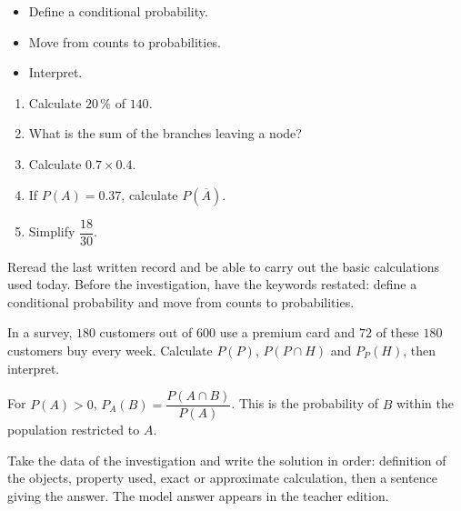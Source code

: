 \begin{objectifs}\begin{itemize}\item Define a conditional probability.\item Move from counts to probabilities.\item Interpret.\end{itemize}\end{objectifs}
\begin{automatismes}\begin{enumerate}\item Calculate $20\,\%$ of $140$. \item What is the sum of the branches leaving a node? \item Calculate $0.7\times0.4$. \item If $P(A)=0.37$, calculate $P(\overline A)$. \item Simplify $\dfrac{18}{30}$. \end{enumerate}\end{automatismes}
\begin{prerequis}Reread the last written record and be able to carry out the basic calculations used today. Before the investigation, have the keywords restated: define a conditional probability and move from counts to probabilities.\end{prerequis}

\begin{activite}
In a survey, $180$ customers out of $600$ use a premium card and $72$ of these $180$ customers buy every week. Calculate $P(P)$, $P(P\cap H)$ and $P_P(H)$, then interpret.

\end{activite}

\begin{traceecrite}For $P(A)>0$, $P_A(B)=\dfrac{P(A\cap B)}{P(A)}$. This is the probability of $B$ within the population restricted to $A$.\end{traceecrite}

\begin{exemple}
Take the data of the investigation and write the solution in order: definition of the objects, property used, exact or approximate calculation, then a sentence giving the answer. The model answer appears in the teacher edition.
\end{exemple}

